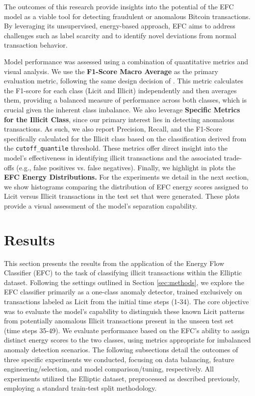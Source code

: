 \documentclass[12pt]{article}
\begin{document}
The outcomes of this research provide insights into the potential of the EFC model as a viable tool for detecting fraudulent or
anomalous Bitcoin transactions. By leveraging its unsupervised, energy-based approach, EFC aims to address challenges such
as label scarcity and to identify novel deviations from normal transaction behavior. 

Model performance was assessed using a combination of quantitative metrics and visual analysis. We use the \textbf{F1-Score Macro Average}
as the primary evaluation metric, following the same design decision of \cite{lorenz2021machinelearningmethodsdetect}.
This metric calculates the F1-score for each class (Licit and Illicit) independently and then averages them, providing a
balanced measure of performance across both classes, which is crucial given the inherent class imbalance. 
We also leverage \textbf{Specific Metrics for the Illicit Class}, since our primary interest lies in detecting anomalous
transactions. As such, we also report Precision, Recall, and the F1-Score specifically calculated for the Illicit class
based on the classification derived from the \texttt{cutoff\_quantile} threshold. These metrics offer direct insight into
the model's effectiveness in identifying illicit transactions and the associated trade-offs (e.g., false positives vs.
false negatives).  Finally, we highlight in plots the \textbf{EFC Energy Distributions.} For the experiments we detail in
the next section, we show histograms comparing the distribution of EFC energy scores assigned to Licit versus Illicit
transactions in the test set that were generated. These plots provide a visual assessment of the model's separation capability.

\section{Results} \label{sec:results}

This section presents the results from the application of the Energy Flow Classifier (EFC) to the task of classifying illicit
transactions within the Elliptic dataset. Following the settings outlined in Section \ref{sec:methods}, we explore the EFC
classifier primarily as a one-class anomaly detector, trained exclusively on transactions labeled as Licit from the initial
time steps (1-34). The core objective was to evaluate the model's capability to distinguish these known Licit patterns from
potentially anomalous Illicit transactions present in the unseen test set (time steps 35-49). We evaluate performance based
on the EFC's ability to assign distinct energy scores to the two classes, using metrics appropriate for imbalanced anomaly
detection scenarios. The following subsections detail the outcomes of three specific experiments we conducted, focusing on
data balancing, feature engineering/selection, and model comparison/tuning, respectively. All experiments utilized the
Elliptic dataset, preprocessed as described previously, employing a standard train-test split methodology.
              
\end{document}
